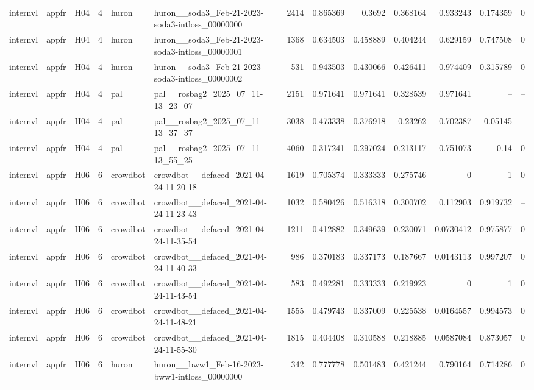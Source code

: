 \begin{longtable}{lllrllrrrrrrr}
internvl & appfr & H04 & 4 & huron & huron\_\_soda3\_Feb-21-2023-soda3-intloss\_00000000 & 2414 & 0.865369 & 0.3692 & 0.368164 & 0.933243 & 0.174359 & 0 \\
internvl & appfr & H04 & 4 & huron & huron\_\_soda3\_Feb-21-2023-soda3-intloss\_00000001 & 1368 & 0.634503 & 0.458889 & 0.404244 & 0.629159 & 0.747508 & 0 \\
internvl & appfr & H04 & 4 & huron & huron\_\_soda3\_Feb-21-2023-soda3-intloss\_00000002 & 531 & 0.943503 & 0.430066 & 0.426411 & 0.974409 & 0.315789 & 0 \\
internvl & appfr & H04 & 4 & pal & pal\_\_rosbag2\_2025\_07\_11-13\_23\_07 & 2151 & 0.971641 & 0.971641 & 0.328539 & 0.971641 & -- & -- \\
internvl & appfr & H04 & 4 & pal & pal\_\_rosbag2\_2025\_07\_11-13\_37\_37 & 3038 & 0.473338 & 0.376918 & 0.23262 & 0.702387 & 0.05145 & -- \\
internvl & appfr & H04 & 4 & pal & pal\_\_rosbag2\_2025\_07\_11-13\_55\_25 & 4060 & 0.317241 & 0.297024 & 0.213117 & 0.751073 & 0.14 & 0 \\
internvl & appfr & H06 & 6 & crowdbot & crowdbot\_\_defaced\_2021-04-24-11-20-18 & 1619 & 0.705374 & 0.333333 & 0.275746 & 0 & 1 & 0 \\
internvl & appfr & H06 & 6 & crowdbot & crowdbot\_\_defaced\_2021-04-24-11-23-43 & 1032 & 0.580426 & 0.516318 & 0.300702 & 0.112903 & 0.919732 & -- \\
internvl & appfr & H06 & 6 & crowdbot & crowdbot\_\_defaced\_2021-04-24-11-35-54 & 1211 & 0.412882 & 0.349639 & 0.230071 & 0.0730412 & 0.975877 & 0 \\
internvl & appfr & H06 & 6 & crowdbot & crowdbot\_\_defaced\_2021-04-24-11-40-33 & 986 & 0.370183 & 0.337173 & 0.187667 & 0.0143113 & 0.997207 & 0 \\
internvl & appfr & H06 & 6 & crowdbot & crowdbot\_\_defaced\_2021-04-24-11-43-54 & 583 & 0.492281 & 0.333333 & 0.219923 & 0 & 1 & 0 \\
internvl & appfr & H06 & 6 & crowdbot & crowdbot\_\_defaced\_2021-04-24-11-48-21 & 1555 & 0.479743 & 0.337009 & 0.225538 & 0.0164557 & 0.994573 & 0 \\
internvl & appfr & H06 & 6 & crowdbot & crowdbot\_\_defaced\_2021-04-24-11-55-30 & 1815 & 0.404408 & 0.310588 & 0.218885 & 0.0587084 & 0.873057 & 0 \\
internvl & appfr & H06 & 6 & huron & huron\_\_bww1\_Feb-16-2023-bww1-intloss\_00000000 & 342 & 0.777778 & 0.501483 & 0.421244 & 0.790164 & 0.714286 & 0 \\

\end{longtable}
